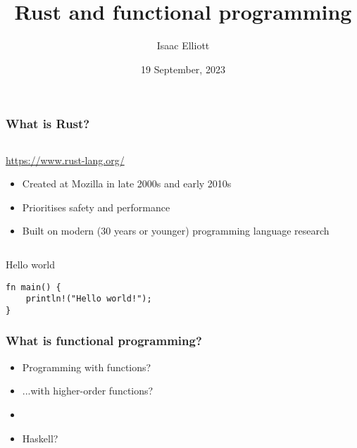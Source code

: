\documentclass[t]{beamer}
\title{Rust and functional programming}
\author{Isaac Elliott}
\date{19 September, 2023}
\begin{document}
\frame{\titlepage}


\begin{frame}[fragile]
\frametitle{What is Rust?}

\begin{columns}

\begin{column}[T]{0.75\textwidth}

\url{https://www.rust-lang.org/}

\begin{itemize}
\item Created at Mozilla in late 2000s and early 2010s
\item Prioritises safety and performance
\item Built on modern (30 years or younger) programming language research
\end{itemize}

\end{column}

\begin{column}[T]{0.25\textwidth}

\end{column}

\end{columns}

\vfill

\begin{block}{Hello world}
\begin{verbatim}
fn main() {
    println!("Hello world!");
}
\end{verbatim}
\end{block}

\end{frame}


\begin{frame}[c,fragile]
\frametitle{What is functional programming?}

\begin{itemize}
\item Programming with functions?
\item ...with higher-order functions?
\item 
\item Haskell? 
\end{itemize}

\end{frame}
\end{document}
